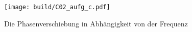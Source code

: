\begin{figure}
    \centering
    \texttt{[image: build/C02\_aufg\_c.pdf]}
    \caption{Die Phasenverschiebung in Abhängigkeit von der Frequenz}
    \label{fig:c_plot}
\end{figure}